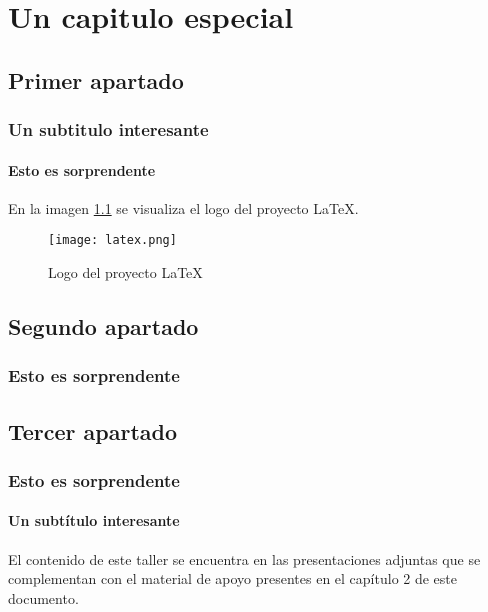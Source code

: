 
\chapter{Un capitulo especial}
\section{Primer apartado}
   \lipsum[4-5]
\subsection{Un subtitulo interesante}
   \lipsum[6]
\subsubsection{Esto es sorprendente}
   \lipsum[2-3]
   En la imagen \ref{fig:proyecto_dos} se visualiza el logo del proyecto \LaTeX.

\begin{figure}[ht]
   \centering
   \texttt{[image: latex.png]}
   \caption{Logo del proyecto \LaTeX}
   \label{fig:proyecto_dos}
\end{figure}
\section{Segundo apartado}
   \lipsum[1]
   \subsection{Esto es sorprendente}
   \lipsum[2]
\section{Tercer apartado}
\subsection{Esto es sorprendente}
\lipsum[3-4]
\subsubsection{Un subtítulo interesante}
\lipsum[5-7]
El contenido de este taller se encuentra en las presentaciones adjuntas que se
complementan con el material de apoyo presentes en el capítulo 2 de este
documento.\cite{Met78}

